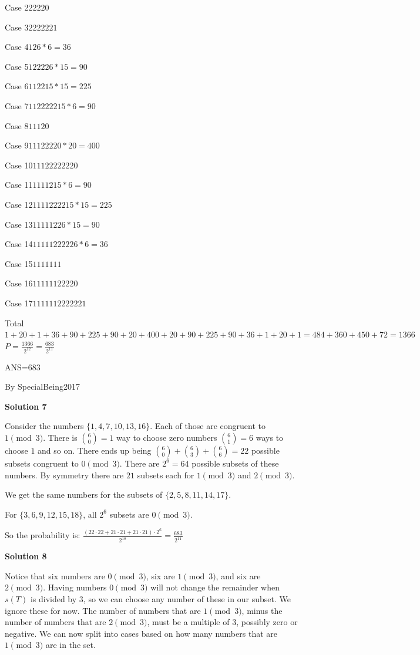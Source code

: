 \begin{enumerate}
 Case 2$222$$20$

 Case 3$222222$$1$

 Case 4$12$$6*6=36$

 Case 5$12222$$6*15=90$

 Case 6$1122$$15*15=225$

 Case 7$1122222$$15*6=90$

 Case 8$111$$20$

 Case 9$111222$$20*20=400$

 Case 10$111222222$$20$

 Case 11$11112$$15*6=90$

 Case 12$11112222$$15*15=225$

 Case 13$1111122$$6*15=90$

 Case 14$1111122222$$6*6=36$

 Case 15$111111$$1$

 Case 16$111111222$$20$

 Case 17$111111222222$$1$

 Total $1+20+1+36+90+225+90+20+400+20+90+225+90+36+1+20+1=484+360+450+72=1366$
$P=\frac{1366}{2^{12}}=\frac{683}{2^{11}}$

 ANS=$\boxed{683}$

 By SpecialBeing2017

 



\textbf{Solution 7}

Consider the numbers $\{1,4,7,10,13,16\}$. Each of those are congruent to $1 \pmod 3$. There is ${6 \choose 0}=1$ way to choose zero numbers ${6 \choose 1}=6$ ways to choose $1$ and so on. There ends up being  ${6 \choose 0}+{6 \choose 3}+{6 \choose 6} = 22$ possible subsets congruent to $0\pmod 3$.  There are $2^6=64$ possible subsets of these numbers. By symmetry there are $21$ subsets each for $1 \pmod 3$ and $2 \pmod3$.

 We get the same numbers for the subsets of $\{2,5,8,11,14,17\}$.

 For $\{3,6,9,12,15,18\}$, all $2^6$ subsets are $0 \pmod3$.

 So the probability is: $\frac{(22\cdot22+21\cdot21+21\cdot21)\cdot2^6}{2^{18}}=\frac{683}{2^{11}}$




\textbf{Solution 8}

Notice that six numbers are $0\pmod3$, six are $1\pmod3$, and six are $2\pmod3$.  Having numbers $0\pmod3$ will not change the remainder when $s(T)$ is divided by $3$, so we can choose any number of these in our subset.  We ignore these for now.  The number of numbers that are $1\pmod3$, minus the number of numbers that are $2\pmod3$, must be a multiple of $3$, possibly zero or negative.  We can now split into cases based on how many numbers that are $1\pmod3$ are in the set.


\end{enumerate}
